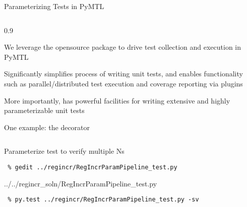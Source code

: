 \begin{frame}{Parameterizing Tests in PyMTL}

\medskip
\begin{cbxcols}
\begin{column}{0.9\tw}
\begin{cbxlist}

  \1 We leverage the opensource  package to drive test
     collection and execution in PyMTL

  \1 Significantly simplifies process of writing unit tests, and enables
     functionality such as parallel/distributed test execution and
     coverage reporting via plugins

  \1 More importantly,  has powerful facilities for writing
     extensive and highly parameterizable unit tests

  \1 One example: the  decorator

\end{cbxlist}
\end{column}
\end{cbxcols}
\end{frame}

\begin{task}\begin{frame}[fragile]{Parameterize test to verify multiple Ns}

\vspace{-0.15in}
\begin{Verbatim}[commandchars=\\\{\}]
 % cd \midtilde/pymtl-tut/build
 % gedit ../regincr/RegIncrParamPipeline_test.py
\end{Verbatim}
\vspace{-0.2in}

%
{../../regincr_soln/RegIncrParamPipeline_test.py}

\vspace{-0.22in}
\begin{Verbatim}
 % py.test ../regincr/RegIncrParamPipeline_test.py -sv
\end{Verbatim}

\end{frame}
\end{task}

